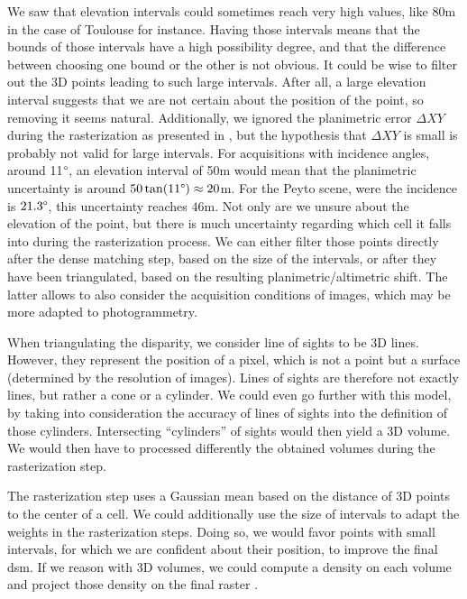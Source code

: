 We saw  that elevation intervals could sometimes reach very high values, like $80$m in the case of Toulouse for instance. Having those intervals means that the bounds of those intervals have a high possibility degree, and that the difference between choosing one bound or the other is not obvious. It could be wise to filter out the 3D points leading to such large intervals. After all, a large elevation interval suggests that we are not certain about the position of the point, so removing it seems natural. Additionally, we ignored the planimetric error $\Delta XY$ during the rasterization as presented in , but the hypothesis that $\Delta XY$ is small is probably not valid for large intervals. For acquisitions with incidence angles, around 11$\degree$, an elevation interval of 50m would mean that the planimetric uncertainty is around $50\tan(11\degree)\approx20$m. For the Peyto scene, were the incidence is $21.3\degree$, this uncertainty reaches $46$m. Not only are we unsure about the elevation of the point, but there is much uncertainty regarding which cell it falls into during the rasterization process. We can either filter those points directly after the dense matching step, based on the size of the intervals, or after they have been triangulated, based on the resulting planimetric/altimetric shift. The latter allows to also consider the acquisition conditions of images, which may be more adapted to photogrammetry.

When triangulating the disparity, we consider line of sights to be 3D lines. However, they represent the position of a pixel, which is not a point but a surface (determined by the resolution of images). Lines of sights are therefore not exactly lines, but rather a cone or a cylinder.  We could even go further with this model, by taking into consideration the accuracy of lines of sights into the definition of those cylinders. Intersecting ``cylinders'' of sights would then yield a 3D volume. We would then have to processed differently the obtained volumes during the rasterization step. 

The rasterization step uses a Gaussian mean based on the distance of 3D points to the center of a cell. We could additionally use the size of intervals to adapt the weights in the rasterization steps. Doing so, we would favor points with small intervals, \ie for which we are confident about their position, to improve the final \acrshort{dsm}. If we reason with 3D volumes, we could compute a density on each volume and project those density on the final raster \etc. 

